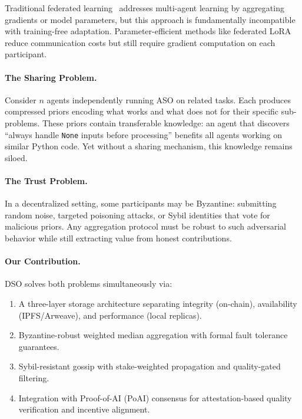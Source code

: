 \documentclass[11pt]{article}
\begin{document}
Traditional federated learning~\cite{mcmahan2017communication} addresses
multi-agent learning by aggregating gradients or model parameters, but this
approach is fundamentally incompatible with training-free adaptation.
Parameter-efficient methods like federated LoRA~\cite{zhang2024fedlora}
reduce communication costs but still require gradient computation on each
participant.

\paragraph{The Sharing Problem.}
Consider $n$ agents independently running ASO on related tasks. Each produces
compressed priors encoding what works and what does not for their specific
sub-problems. These priors contain transferable knowledge: an agent that
discovers ``always handle \texttt{None} inputs before processing'' benefits all
agents working on similar Python code. Yet without a sharing mechanism, this
knowledge remains siloed.

\paragraph{The Trust Problem.}
In a decentralized setting, some participants may be Byzantine: submitting
random noise, targeted poisoning attacks, or Sybil identities that vote for
malicious priors. Any aggregation protocol must be robust to such adversarial
behavior while still extracting value from honest contributions.

\paragraph{Our Contribution.}
DSO solves both problems simultaneously via:
\begin{enumerate}[leftmargin=1.5em]
    \item A three-layer storage architecture separating integrity (on-chain),
          availability (IPFS/Arweave), and performance (local replicas).
    \item Byzantine-robust weighted median aggregation with formal fault
          tolerance guarantees.
    \item Sybil-resistant gossip with stake-weighted propagation and
          quality-gated filtering.
    \item Integration with Proof-of-AI (PoAI) consensus for attestation-based
          quality verification and incentive alignment.
\end{enumerate}
\end{document}
